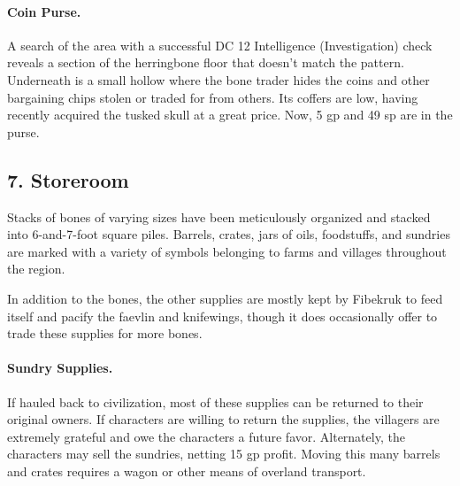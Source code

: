 \documentclass[10pt,a4paper,twoside,twocolumn,openany,bg=print,nodeprecatedcode]{dndbook}
\begin{document}
\paragraph{Coin Purse.}
A search of the area with a successful DC 12 Intelligence (Investigation) check reveals a section of the herringbone floor that doesn't match the pattern. Underneath is a small hollow where the bone trader hides the coins and other bargaining chips stolen or traded for from others. Its coffers are low, having recently acquired the tusked skull at a great price. Now, 5 gp and 49 sp are in the purse.
\subsection{7. Storeroom}
\begin{DndReadAloud}{}
Stacks of bones of varying sizes have been meticulously organized and stacked into 6-and-7-foot square piles. Barrels, crates, jars of oils, foodstuffs, and sundries are marked with a variety of symbols belonging to farms and villages throughout the region.
\end{DndReadAloud}

In addition to the bones, the other supplies are mostly kept by Fibekruk to feed itself and pacify the faevlin and knifewings, though it does occasionally offer to trade these supplies for more bones.
\paragraph{Sundry Supplies.}
If hauled back to civilization, most of these supplies can be returned to their original owners. If characters are willing to return the supplies, the villagers are extremely grateful and owe the characters a future favor. Alternately, the characters may sell the sundries, netting 15 gp profit. Moving this many barrels and crates requires a wagon or other means of overland transport.
\end{document}
